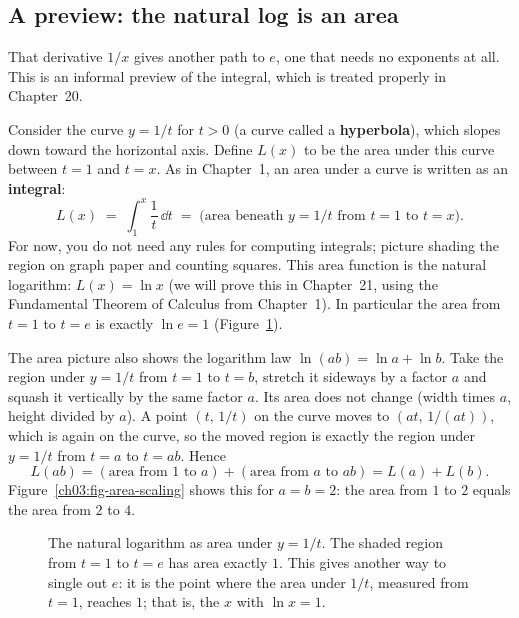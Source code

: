 \subsection{A preview: the natural log is an area}

That derivative $1/x$ gives another path to $e$, one that needs no exponents at all. This is an informal preview of the integral, which is treated properly in Chapter~20.

Consider the curve $y=1/t$ for $t>0$ (a curve called a \textbf{hyperbola}), which slopes down toward the horizontal axis. Define $L(x)$ to be the area under this curve between $t=1$ and $t=x$. As in Chapter~1, an area under a curve is written as an \textbf{integral}:
\[
L(x) \;=\; \int_1^x \frac{1}{t}\,\dd t \;=\; \text{(area beneath } y=1/t \text{ from } t=1 \text{ to } t=x).
\]
For now, you do not need any rules for computing integrals; picture shading the region on graph paper and counting squares. This area function is the natural logarithm: $L(x)=\ln x$ (we will prove this in Chapter~21, using the Fundamental Theorem of Calculus from Chapter~1). In particular the area from $t=1$ to $t=e$ is exactly $\ln e = 1$ (Figure~\ref{ch03:fig-area-log}).

The area picture also shows the logarithm law $\ln(ab)=\ln a+\ln b$. Take the region under $y=1/t$ from $t=1$ to $t=b$, stretch it sideways by a factor $a$ and squash it vertically by the same factor $a$. Its area does not change (width times $a$, height divided by $a$). A point $(t,\,1/t)$ on the curve moves to $(at,\,1/(at))$, which is again on the curve, so the moved region is exactly the region under $y=1/t$ from $t=a$ to $t=ab$. Hence
\[
L(ab) = (\text{area from } 1 \text{ to } a) + (\text{area from } a \text{ to } ab) = L(a) + L(b).
\]
Figure~\ref{ch03:fig-area-scaling} shows this for $a=b=2$: the area from $1$ to $2$ equals the area from $2$ to $4$.

\begin{figure}[htbp]
\centering
{}
\caption{The natural logarithm as area under $y=1/t$. The shaded region from $t=1$ to $t=e$ has area exactly $1$. This gives another way to single out $e$: it is the point where the area under $1/t$, measured from $t=1$, reaches $1$; that is, the $x$ with $\ln x = 1$.}
\label{ch03:fig-area-log}
\end{figure}

